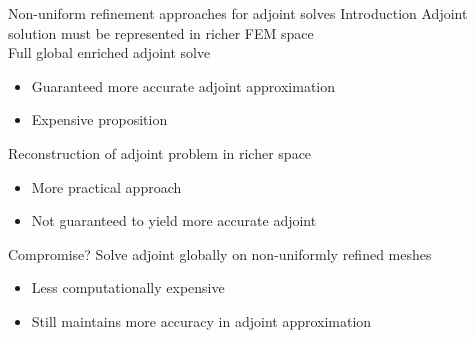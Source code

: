 \documentclass[fleqn]{beamer}
\begin{document}

\begin{frame}{Non-uniform refinement approaches for adjoint solves}
{Introduction}
Adjoint solution must be represented in richer FEM space \\
Full global enriched adjoint solve
\begin{itemize}
\item Guaranteed more accurate adjoint approximation
\item Expensive proposition
\end{itemize}
Reconstruction of adjoint problem in richer space
\begin{itemize}
\item More practical approach
\item Not guaranteed to yield more accurate adjoint
\end{itemize}
Compromise? Solve adjoint globally on non-uniformly refined meshes \\
\begin{itemize}
\item Less computationally expensive
\item Still maintains more accuracy in adjoint approximation
\end{itemize}
\end{frame}

\end{document}
